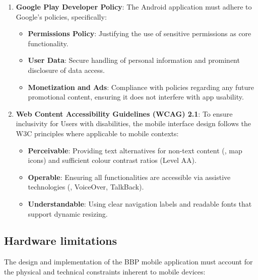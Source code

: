 \begin{enumerate}
    \item \textbf{Google Play Developer Policy}:
    The Android application must adhere to Google's policies, specifically:
    \begin{itemize}
        \item \textbf{Permissions Policy}: Justifying the use of sensitive permissions as core functionality.
        \item \textbf{User Data}: Secure handling of personal information and prominent disclosure of data access.
        \item \textbf{Monetization and Ads}: Compliance with policies regarding any future promotional content, ensuring it does not interfere with app usability.
    \end{itemize}

    \item \textbf{Web Content Accessibility Guidelines (WCAG) 2.1}:
    To ensure inclusivity for Users with disabilities, the mobile interface design follows the W3C principles where applicable to mobile contexts:
    \begin{itemize}
        \item \textbf{Perceivable}: Providing text alternatives for non-text content (\eg, map icons) and sufficient colour contrast ratios (Level AA).
        \item \textbf{Operable}: Ensuring all functionalities are accessible via assistive technologies (\eg, VoiceOver, TalkBack).
        \item \textbf{Understandable}: Using clear navigation labels and readable fonts that support dynamic resizing.
    \end{itemize}
\end{enumerate}

\subsection{Hardware limitations}
The design and implementation of the BBP mobile application must account for the physical and technical constraints inherent to mobile devices:

